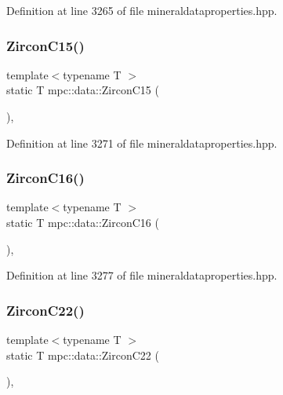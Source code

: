 Definition at line 3265 of file mineraldataproperties.\+hpp.

\mbox{\label{namespacempc_1_1data_a715689f6b0cd2d9576aafcbe04a00807}} 
\subsubsection{\texorpdfstring{Zircon\+C15()}{ZirconC15()}}
{\footnotesize\ttfamily template$<$typename T $>$ \\
static T mpc\+::data\+::\+Zircon\+C15 (\begin{DoxyParamCaption}{ }\end{DoxyParamCaption})\hspace{0.3cm}{\ttfamily [inline]}, {\ttfamily [static]}}



Definition at line 3271 of file mineraldataproperties.\+hpp.

\mbox{\label{namespacempc_1_1data_ade008832ffd45882b66bb58f0d61daea}} 
\subsubsection{\texorpdfstring{Zircon\+C16()}{ZirconC16()}}
{\footnotesize\ttfamily template$<$typename T $>$ \\
static T mpc\+::data\+::\+Zircon\+C16 (\begin{DoxyParamCaption}{ }\end{DoxyParamCaption})\hspace{0.3cm}{\ttfamily [inline]}, {\ttfamily [static]}}



Definition at line 3277 of file mineraldataproperties.\+hpp.

\mbox{\label{namespacempc_1_1data_ad33456d557784b521d2d776ec4678353}} 
\subsubsection{\texorpdfstring{Zircon\+C22()}{ZirconC22()}}
{\footnotesize\ttfamily template$<$typename T $>$ \\
static T mpc\+::data\+::\+Zircon\+C22 (\begin{DoxyParamCaption}{ }\end{DoxyParamCaption})\hspace{0.3cm}{\ttfamily [inline]}, {\ttfamily [static]}}



